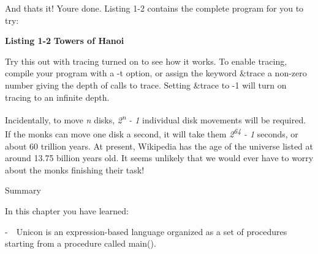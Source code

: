 And that{\textquotesingle}s it! You{\textquotesingle}re done. Listing
1-2 contains the complete program for you to try:

\bigskip

{\sffamily\bfseries Listing 1-2}
{\sffamily\bfseries Towers of Hanoi}


Try this out with tracing turned on to see how it works.
To enable tracing, compile your program with a
\textsf{{}-t} option, or assign the keyword \textsf{\&trace} a non-zero
number giving the depth of calls to trace. Setting \textsf{\&trace} to
-1 will turn on tracing to an infinite depth.

Incidentally, to move \textit{n} disks,
\textit{2}\textit{\textsuperscript{n}}\textit{ - 1} individual disk
movements will be required. If the monks can move one disk a second, it
will take them \textit{2}\textit{\textsuperscript{64}}\textit{ - 1}
seconds, or about 60 trillion years. At present, Wikipedia has the age of
the universe listed at around 13.75 billion years old. It seems unlikely
that we would ever have to worry about the monks finishing their
task!

{\sffamily
Summary}

In this chapter you have learned:

{}-\ \ Unicon is an expression-based language organized as a set of
procedures starting from a procedure called \textsf{main()}.

